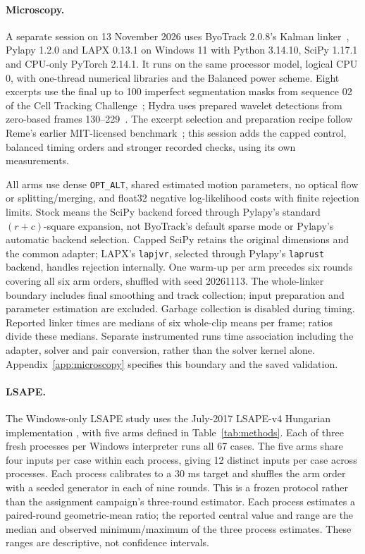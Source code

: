 \documentclass[11pt,a4paper]{article}
\begin{document}
\paragraph{Microscopy.}
A separate session on 13 November 2026 uses ByoTrack 2.0.8's Kalman linker~\cite{byotrack2024kalman}, Pylapy 1.2.0 and LAPX 0.13.1 on Windows 11 with Python 3.14.10, SciPy 1.17.1 and CPU-only PyTorch 2.14.1. It runs on the same processor model, logical CPU 0, with one-thread numerical libraries and the Balanced power scheme. Eight excerpts use the final up to 100 imperfect segmentation masks from sequence 02 of the Cell Tracking Challenge~\cite{maska2023ctc}; Hydra uses prepared wavelet detections from zero-based frames 130--229~\cite{hanson2024hydra}. The excerpt selection and preparation recipe follow Reme's earlier MIT-licensed benchmark~\cite{reme2026cellbenchmark}; this session adds the capped control, balanced timing orders and stronger recorded checks, using its own measurements.

All arms use dense \texttt{OPT\_ALT}, shared estimated motion parameters, no optical flow or splitting/merging, and float32 negative log-likelihood costs with finite rejection limits. Stock means the SciPy backend forced through Pylapy's standard $(r+c)$-square expansion, not ByoTrack's default sparse mode or Pylapy's automatic backend selection. Capped SciPy retains the original dimensions and the common adapter; LAPX's \texttt{lapjvr}, selected through Pylapy's \texttt{laprust} backend, handles rejection internally. One warm-up per arm precedes six rounds covering all six arm orders, shuffled with seed 20261113. The whole-linker boundary includes final smoothing and track collection; input preparation and parameter estimation are excluded. Garbage collection is disabled during timing. Reported linker times are medians of six whole-clip means per frame; ratios divide these medians. Separate instrumented runs time association including the adapter, solver and pair conversion, rather than the solver kernel alone. Appendix~\ref{app:microscopy} specifies this boundary and the saved validation.

\paragraph{LSAPE.}
The Windows-only LSAPE study uses the July-2017 LSAPE-v4 Hungarian implementation \cite{lsape2017}, with five arms defined in Table~\ref{tab:methods}. Each of three fresh processes per Windows interpreter runs all 67 cases. The five arms share four inputs per case within each process, giving 12 distinct inputs per case across processes. Each process calibrates to a 30 ms target and shuffles the arm order with a seeded generator in each of nine rounds. This is a frozen protocol rather than the assignment campaign's three-round estimator. Each process estimates a paired-round geometric-mean ratio; the reported central value and range are the median and observed minimum/maximum of the three process estimates. These ranges are descriptive, not confidence intervals.
\end{document}
